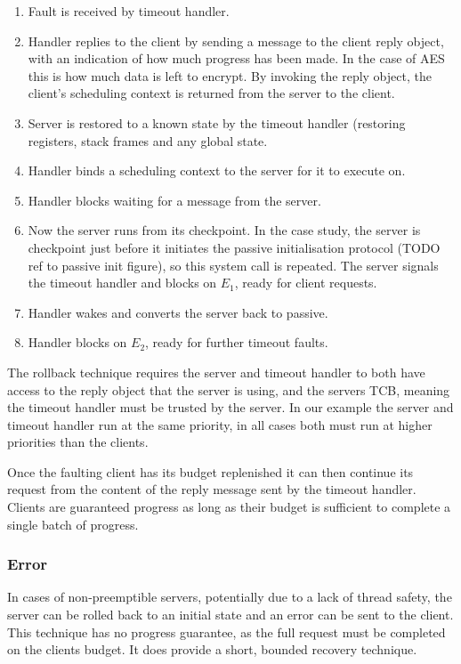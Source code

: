 \begin{enumerate}\label{e:rollback}
    \item Fault is received by timeout handler.
    \item Handler replies to the client by sending a message to the client reply
        object, with an indication of how much progress has been made. In the case of \gls{AES} this
        is how much data is left to encrypt. By invoking the reply object, the client's
        scheduling context is returned from the server to the client.
    \item Server is restored to a known state by the timeout handler (restoring registers, stack
        frames and any global state. 
    \item Handler binds a scheduling context to the server for it to execute on.
    \item Handler blocks waiting for a message from the server.
    \item Now the server runs from its checkpoint. In the case study, the server is checkpoint just
        before it initiates the passive initialisation protocol (TODO ref to passive init figure), so this system call is
        repeated. The server signals the timeout handler and blocks on $E_{1}$, ready for client
        requests.
    \item Handler wakes and converts the server back to passive.
    \item Handler blocks on $E_{2}$, ready for further timeout faults.
\end{enumerate}

The rollback technique requires the server and timeout handler to both have access to the reply
object that the server is using, and the servers \gls{TCB}, meaning the timeout handler must be
trusted by the server. In our example the server and timeout handler run at the same priority, in
all cases both must run at higher priorities than the clients. 

Once the faulting client has its budget replenished it can then continue its request from the
content of the reply message sent by the timeout handler. Clients are guaranteed progress as long as
their budget is sufficient to complete a single batch of progress.

\subsubsection{Error}

In cases of non-preemptible servers, potentially due to a lack of thread safety, the server can be
rolled back to an initial state and an error can be sent to the client. This technique has no
progress guarantee, as the full request must be completed on the clients budget. It does provide a
short, bounded recovery technique.

